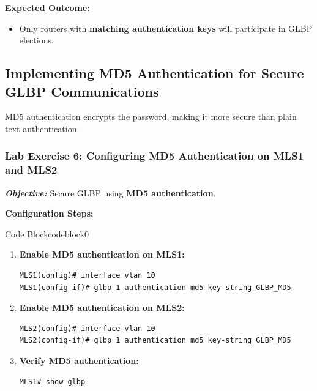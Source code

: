 \documentclass[a4paper]{book}
\begin{document}
\textbf{Expected Outcome:}
\begin{itemize}
\item Only routers with \textbf{matching authentication keys} will participate in GLBP elections.
\end{itemize}

\subsection{Implementing MD5 Authentication for Secure GLBP Communications}
MD5 authentication encrypts the password, making it more secure than plain text authentication.

\subsubsection{Lab Exercise 6: Configuring MD5 Authentication on MLS1 and MLS2}
\textbf{\textit{Objective:}} Secure GLBP using \textbf{MD5 authentication}.
\vspace{1.5em}

\textbf{Configuration Steps:}

\vspace{1.5em}


\begin{ocg}{Code Block}{codeblock}{0}

\vspace{0.5cm}


\begin{enumerate}
\item \textbf{Enable MD5 authentication on MLS1:}
\begin{lstlisting}
MLS1(config)# interface vlan 10
MLS1(config-if)# glbp 1 authentication md5 key-string GLBP_MD5
\end{lstlisting}

\item \textbf{Enable MD5 authentication on MLS2:}
\begin{lstlisting}
MLS2(config)# interface vlan 10
MLS2(config-if)# glbp 1 authentication md5 key-string GLBP_MD5
\end{lstlisting}

\item \textbf{Verify MD5 authentication:}
\begin{lstlisting}
MLS1# show glbp
\end{lstlisting}
\end{enumerate}
\end{ocg}
\end{document}
